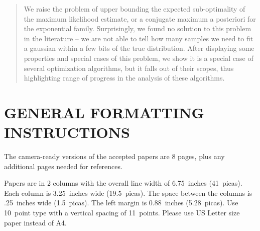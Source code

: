 \documentclass[twoside]{article}
\begin{document}
%

%


\begin{abstract}
We raise the problem of upper bounding the expected sub-optimality of the maximum likelihood estimate, or a conjugate maximum a posteriori for the exponential family. 
Surprisingly, we found no solution to this problem in the literature -- we are not able to tell how many samples we need to fit a gaussian within a few bits of the true distribution.
After displaying some properties and special cases of this problem, 
we show it is a special case of several optimization algorithms, but it falls out of their scopes, thus highlighting range of progress in the analysis of these algorithms.
\end{abstract}

\section{GENERAL FORMATTING INSTRUCTIONS}

The camera-ready versions of the accepted papers are 8 pages,
plus any additional pages needed for references.

Papers are in 2 columns with the overall line width of 6.75~inches (41~picas).
Each column is 3.25~inches wide (19.5~picas).  The space
between the columns is .25~inches wide (1.5~picas).  The left margin is 0.88~inches (5.28~picas).
Use 10~point type with a vertical spacing of
11~points. Please use US Letter size paper instead of A4.
\end{document}
